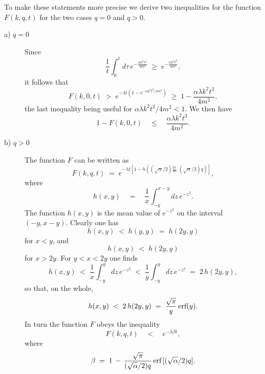 \documentclass[10pt,a4paper]{article}
\begin{document}
To make these statements more precise we derive two inequalities
for the function $F(k,q,t)$ for the two cases $q=0$ and $q>0$.
\begin{description}
\item[a) $q=0$] Since
\begin{equation}
\frac{1}{t}\int_{0}^{t} d\tau\, e^{\displaystyle - \frac{\alpha
k^{2}\tau^{2}}{4m^{2}}} \; \geq \; e^{\displaystyle - \frac{\alpha
k^{2}t^{2}}{4m^{2}}},
\end{equation}
it follows that
\begin{equation} \label{hdgxTJ}
F(k,0,t) \; > \; e^{\displaystyle -\lambda t \left( 1 -
e^{\displaystyle - \alpha k^{2} t^{2}/4m^{2}} \right)} \; \geq \;
1 - \frac{\alpha\lambda k^{2} t^{3}}{4m^{2}},
\end{equation}
the last inequality being useful for $\alpha\lambda k^{2}
t^{2}/4m^{2} < 1$. We then have
\begin{equation} \label{lkjh}
1 - F(k,0,t) \quad \leq \quad \frac{\alpha\lambda k^{2}
t^{3}}{4m^{2}}.
\end{equation}
\item[b) $q>0$] The function $F$ can be written as
\begin{equation}
F(k,q,t) \; = \; e^{\displaystyle -\lambda t \left[ 1 - h\left(
(\sqrt{\alpha}/2)\frac{kt}{m}, (\sqrt{\alpha}/2)q\right) \right]},
\end{equation}
where
\begin{equation}
h(x,y) \quad = \quad \frac{1}{x}\int_{-y}^{x-y}dz\,
e^{\displaystyle - z^{2}}.
\end{equation}
The function $h(x,y)$ is the mean value of $e^{-z^{2}}$ on the
interval $(-y, x-y)$. Clearly one has
\begin{equation}
h(x,y) \; < \; h(y,y) \; = \; h(2y,y)
\end{equation}
for $x < y$, and
\begin{equation}
h(x,y) \; < \; h(2y,y)
\end{equation}
for $x > 2y$. For $y < x < 2y$ one finds
\begin{equation}
h(x,y) \; < \; \frac{1}{x}\int_{-y}^{y}dz\, e^{\displaystyle -
z^{2}} \; < \; \frac{1}{y}\int_{-y}^{y}dz\, e^{\displaystyle -
z^{2}} \; = \; 2\,h(2y,y),
\end{equation}
so that, on the whole,
\begin{equation}
h(x,y) \; < \; 2\, h(2y,y) \; = \; \frac{\sqrt{\pi}}{y}\,
\makebox{erf} (y).
\end{equation}
In turn the function $F$ obeys the inequality
\begin{equation} \label{ldem}
F(k,q,t) \quad < \quad e^{\displaystyle -\lambda\beta t},
\end{equation}
where
\begin{equation} \label{gupnld}
\beta \; =\; 1 \, - \, \frac{\sqrt{\pi}}{(\sqrt{\alpha}/2)q}\,
\makebox{erf}\,[(\sqrt{\alpha}/2)q].
\end{equation}
\end{description}
\end{document}

